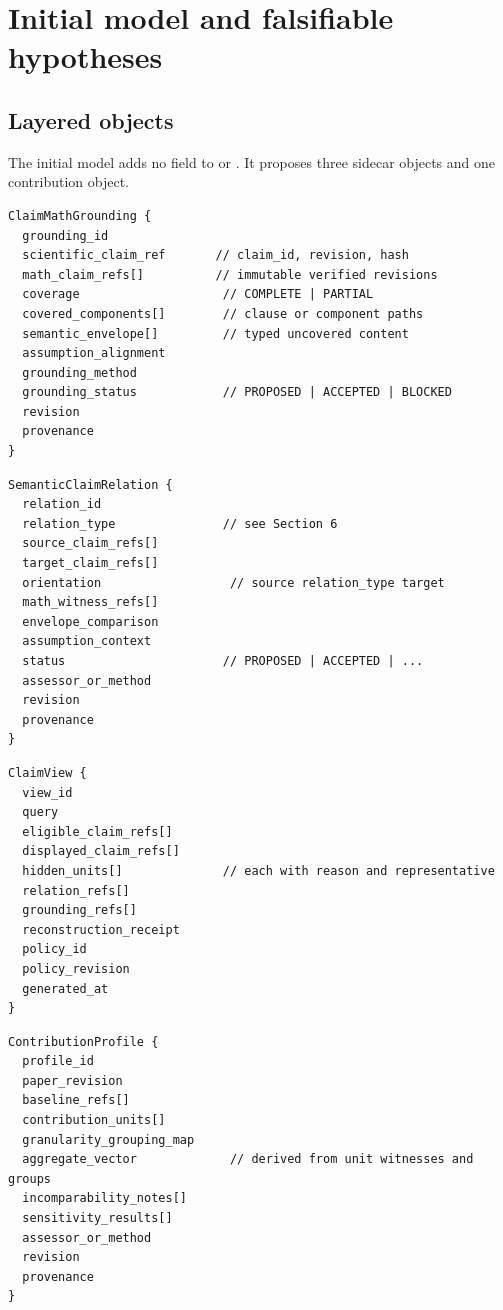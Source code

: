 \section{Initial model and falsifiable hypotheses}\label{sec:initial-model}

\subsection{Layered objects}

The initial model adds no field to \ScientificClaim{} or \MathClaim{}. It proposes three sidecar objects and one contribution object.

\begin{lstlisting}[style=interface]
ClaimMathGrounding {
  grounding_id
  scientific_claim_ref       // claim_id, revision, hash
  math_claim_refs[]          // immutable verified revisions
  coverage                    // COMPLETE | PARTIAL
  covered_components[]        // clause or component paths
  semantic_envelope[]         // typed uncovered content
  assumption_alignment
  grounding_method
  grounding_status            // PROPOSED | ACCEPTED | BLOCKED
  revision
  provenance
}
\end{lstlisting}

\begin{lstlisting}[style=interface]
SemanticClaimRelation {
  relation_id
  relation_type               // see Section 6
  source_claim_refs[]
  target_claim_refs[]
  orientation                  // source relation_type target
  math_witness_refs[]
  envelope_comparison
  assumption_context
  status                      // PROPOSED | ACCEPTED | ...
  assessor_or_method
  revision
  provenance
}
\end{lstlisting}

\begin{lstlisting}[style=interface]
ClaimView {
  view_id
  query
  eligible_claim_refs[]
  displayed_claim_refs[]
  hidden_units[]              // each with reason and representative
  relation_refs[]
  grounding_refs[]
  reconstruction_receipt
  policy_id
  policy_revision
  generated_at
}
\end{lstlisting}

\begin{lstlisting}[style=interface]
ContributionProfile {
  profile_id
  paper_revision
  baseline_refs[]
  contribution_units[]
  granularity_grouping_map
  aggregate_vector             // derived from unit witnesses and groups
  incomparability_notes[]
  sensitivity_results[]
  assessor_or_method
  revision
  provenance
}
\end{lstlisting}

